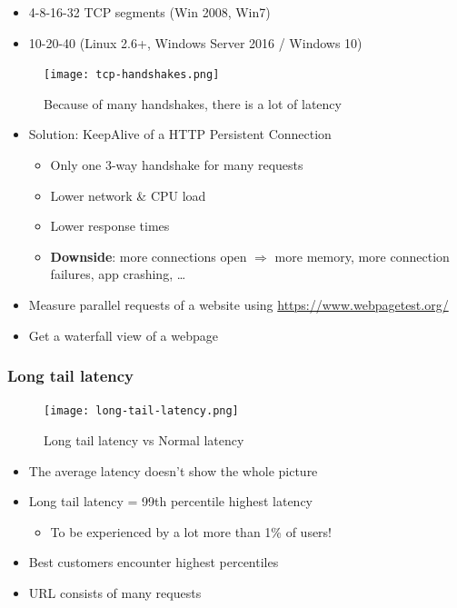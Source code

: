 \documentclass{article}
\begin{document}
\begin{itemize}
    \item 4-8-16-32 TCP segments (Win 2008, Win7)
    \item 10-20-40 (Linux 2.6+, Windows Server 2016 / Windows 10)
\end{itemize}

\begin{figure}[H]
    \centering
    \texttt{[image: tcp-handshakes.png]}
    \caption{Because of many handshakes, there is a lot of latency}
\end{figure}

\begin{itemize}
    \item Solution: KeepAlive of a HTTP Persistent Connection
    \begin{itemize}
        \item Only one 3-way handshake for many requests
        \item Lower network \& CPU load
        \item Lower response times
        \item \textbf{Downside}: more connections open $\Rightarrow$ more memory, more connection failures, app crashing, \dots
    \end{itemize}
\end{itemize}

\begin{itemize}
    \item Measure parallel requests of a website using \url{https://www.webpagetest.org/}
    \item Get a waterfall view of a webpage
\end{itemize}

\subsubsection{Long tail latency}

\begin{figure}[H]
    \centering
    \texttt{[image: long-tail-latency.png]}
    \caption{Long tail latency vs Normal latency}
\end{figure}


\begin{itemize}
    \item The average latency doesn't show the whole picture
    \item Long tail latency = 99th percentile highest latency
    \begin{itemize}
        \item To be experienced by a lot more than 1\% of users!
    \end{itemize}
    \item Best customers encounter highest percentiles
    \item URL consists of many requests
\end{itemize}
\end{document}
